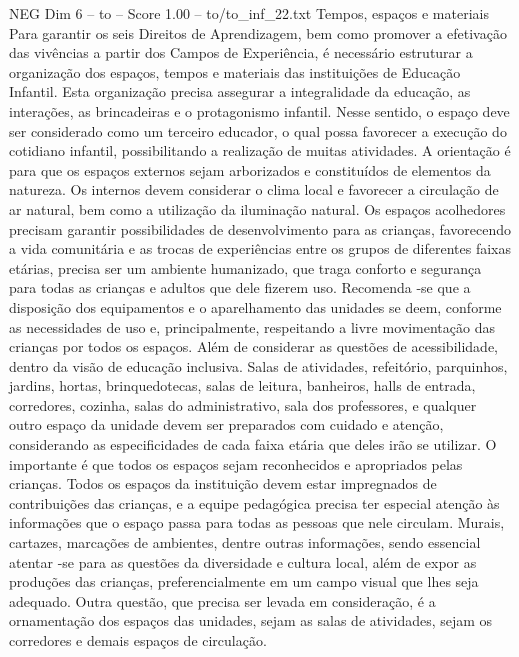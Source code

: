 \begin{textsample}{NEG Dim 6 – to – Score 1.00 – to/to\_inf\_22.txt}  \label{ex:f6_neg_117}
Tempos, espaços e materiais Para garantir os seis Direitos de Aprendizagem, bem como promover a efetivação das vivências a partir dos Campos de Experiência, é necessário estruturar a organização dos espaços, tempos e materiais das instituições de Educação Infantil.
Esta organização precisa assegurar a integralidade da educação, as interações, as brincadeiras e o protagonismo infantil.
Nesse sentido, o espaço deve ser considerado como um terceiro educador, o qual possa favorecer a execução do cotidiano infantil, possibilitando a realização de muitas atividades.
A orientação é para que os espaços externos sejam arborizados e constituídos de elementos da natureza.
Os internos devem considerar o clima local e favorecer a circulação de ar natural, bem como a utilização da iluminação natural.
Os espaços acolhedores precisam garantir possibilidades de desenvolvimento para as crianças, favorecendo a vida comunitária e as trocas de experiências entre os grupos de diferentes faixas etárias, precisa ser um ambiente humanizado, que traga conforto e segurança para todas as crianças e adultos que dele fizerem uso.
Recomenda -se que a disposição dos equipamentos e o aparelhamento das unidades se deem, conforme as necessidades de uso e, principalmente, respeitando a livre movimentação das crianças por todos os espaços.
Além de considerar as questões de acessibilidade, dentro da visão de educação inclusiva.
Salas de atividades, refeitório, parquinhos, jardins, hortas, brinquedotecas, salas de leitura, banheiros, halls de entrada, corredores, cozinha, salas do administrativo, sala dos professores, e qualquer outro espaço da unidade devem ser preparados com cuidado e atenção, considerando as especificidades de cada faixa etária que deles irão se utilizar.
O importante é que todos os espaços sejam reconhecidos e apropriados pelas crianças.
Todos os espaços da instituição devem estar impregnados de contribuições das crianças, e a equipe pedagógica precisa ter especial atenção às informações que o espaço passa para todas as pessoas que nele circulam.
Murais, cartazes, marcações de ambientes, dentre outras informações, sendo essencial atentar -se para as questões da diversidade e cultura local, além de expor as produções das crianças, preferencialmente em um campo visual que lhes seja adequado.
Outra questão, que precisa ser levada em consideração, é a ornamentação dos espaços das unidades, sejam as salas de atividades, sejam os corredores e demais espaços de circulação.

\end{textsample}
